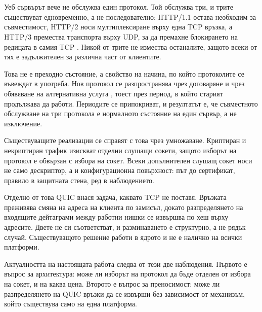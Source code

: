 \clearpage
{}
\section*{}

\subsection*{}

Уеб сървърът вече не обслужва един протокол. Той обслужва три, и трите съществуват
едновременно, а не последователно: HTTP/1.1 остава необходим за съвместимост, HTTP/2 носи
мултиплексиране върху една TCP връзка, а HTTP/3 премества транспорта върху UDP, за да
премахне блокирането на редицата в самия TCP \cite{rfc9114}. Никой от трите не измества
останалите, защото всеки от тях е задължителен за различна част от клиентите.

Това не е преходно състояние, а свойство на начина, по който протоколите се въвеждат в
употреба. Нов протокол се разпространява чрез договаряне и чрез обявяване на алтернативна
услуга \cite{rfc7838}, тоест през период, в който старият продължава да работи. Периодите се
припокриват, и резултатът е, че съвместното обслужване на три протокола е нормалното
състояние на един сървър, а не изключение.

Съществуващите реализации се справят с това чрез умножаване. Криптиран и некриптиран трафик
изискват отделни слушащи сокети, защото изборът на протокол е обвързан с избора на сокет.
Всеки допълнителен слушащ сокет носи не само дескриптор, а и конфигурационна повърхност: път
до сертификат, правило в защитната стена, ред в наблюдението.

Отделно от това QUIC внася задача, каквато TCP не поставя. Връзката преживява смяна на
адреса на клиента по замисъл, докато разпределянето на входящите дейтаграми между работни
нишки се извършва по хеш върху адресите. Двете не си съответстват, и разминаването е
структурно, а не рядък случай. Съществуващото решение работи в ядрото и не е налично на
всички платформи.

Актуалността на настоящата работа следва от тези две наблюдения. Първото е въпрос за
архитектура: може ли изборът на протокол да бъде отделен от избора на сокет, и на каква цена.
Второто е въпрос за преносимост: може ли разпределянето на QUIC връзки да се извърши без
зависимост от механизъм, който съществува само на една платформа.


